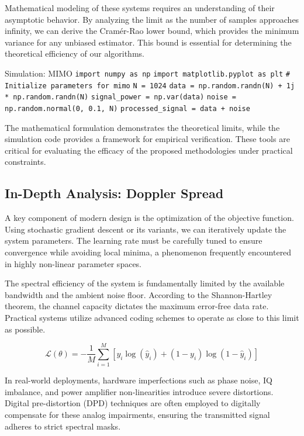 Mathematical modeling of these systems requires an understanding of their asymptotic behavior. By analyzing the limit as the number of samples approaches infinity, we can derive the Cramér-Rao lower bound, which provides the minimum variance for any unbiased estimator. This bound is essential for determining the theoretical efficiency of our algorithms.

\begin{pythonbox}{Simulation: MIMO}
\texttt{import numpy as np}
\texttt{import matplotlib.pyplot as plt}
\texttt{}
\texttt{\# Initialize parameters for mimo}
\texttt{N = 1024}
\texttt{data = np.random.randn(N) + 1j * np.random.randn(N)}
\texttt{signal\_power = np.var(data)}
\texttt{noise = np.random.normal(0, 0.1, N)}
\texttt{processed\_signal = data + noise}
\end{pythonbox}

\vspace{0.5cm}
The mathematical formulation demonstrates the theoretical limits, while the simulation code provides a framework for empirical verification. These tools are critical for evaluating the efficacy of the proposed methodologies under practical constraints.


\subsection{In-Depth Analysis: Doppler Spread}
A key component of modern design is the optimization of the objective function. Using stochastic gradient descent or its variants, we can iteratively update the system parameters. The learning rate must be carefully tuned to ensure convergence while avoiding local minima, a phenomenon frequently encountered in highly non-linear parameter spaces.

The spectral efficiency of the system is fundamentally limited by the available bandwidth and the ambient noise floor. According to the Shannon-Hartley theorem, the channel capacity dictates the maximum error-free data rate. Practical systems utilize advanced coding schemes to operate as close to this limit as possible.

\begin{equation}
    \mathcal{L}(\theta) = -\frac{1}{M} \sum_{i=1}^{M} \left[ y_i \log(\hat{y}_i) + (1-y_i)\log(1-\hat{y}_i) \right]
\end{equation}

In real-world deployments, hardware imperfections such as phase noise, IQ imbalance, and power amplifier non-linearities introduce severe distortions. Digital pre-distortion (DPD) techniques are often employed to digitally compensate for these analog impairments, ensuring the transmitted signal adheres to strict spectral masks.

